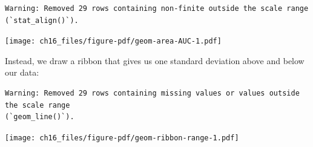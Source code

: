 \documentclass[
  letterpaper,
  DIV=11,
  numbers=noendperiod]{scrreprt}
\newenvironment{Shaded}{\begin{snugshade}}{\end{snugshade}}
\newcommand{\AttributeTok}[1]{\textcolor[rgb]{0.40,0.45,0.13}{#1}}
\newcommand{\ConstantTok}[1]{\textcolor[rgb]{0.56,0.35,0.01}{#1}}
\newcommand{\DecValTok}[1]{\textcolor[rgb]{0.68,0.00,0.00}{#1}}
\newcommand{\FunctionTok}[1]{\textcolor[rgb]{0.28,0.35,0.67}{#1}}
\newcommand{\NormalTok}[1]{\textcolor[rgb]{0.00,0.23,0.31}{#1}}
\newcommand{\OtherTok}[1]{\textcolor[rgb]{0.00,0.23,0.31}{#1}}
\newcommand{\SpecialCharTok}[1]{\textcolor[rgb]{0.37,0.37,0.37}{#1}}
\newcommand{\StringTok}[1]{\textcolor[rgb]{0.13,0.47,0.30}{#1}}
\begin{document}
\begin{verbatim}
Warning: Removed 29 rows containing non-finite outside the scale range
(`stat_align()`).
\end{verbatim}

\texttt{[image: ch16\_files/figure-pdf/geom-area-AUC-1.pdf]}

Instead, we draw a ribbon that gives us one standard deviation above and
below our data:

\begin{Shaded}
\end{Shaded}

\begin{verbatim}
Warning: Removed 29 rows containing missing values or values outside the scale range
(`geom_line()`).
\end{verbatim}

\texttt{[image: ch16\_files/figure-pdf/geom-ribbon-range-1.pdf]}

\end{document}
